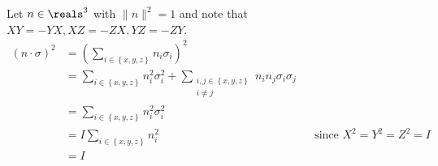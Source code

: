 \begingroup
\newcommand{\roto}[2]{R_{#1} \left( #2 \right)}
%
\par Let $n \in \reals^3$ with $\lVert n \rVert^2 = 1$ and note that $XY = -YX, XZ = -ZX, YZ = -ZY$.
%
\begin{align*}
\left( n \cdot \sigma \right) ^2 &= \left( \sum_{i \in \left\{ x, y, z \right\}}{n_i \sigma_i} \right)^2 \\
&= \sum_{i \in \left\{ x, y, z \right\}}{n_i^2 \sigma_i^2} + \sum_{\substack{i, j \in \left\{ x, y, z \right\} \\ i \ne j}}{n_i n_j \sigma_i \sigma_j} \\
&= \sum_{i \in \left\{ x, y, z \right\}}{n_i^2 \sigma_i^2} \\
&= I \sum_{i \in \left\{ x, y, z \right\}}{n_i^2} && \text{since $X^2 = Y^2 = Z^2 = I$} \\
&= I
\end{align*}
%
\endgroup
